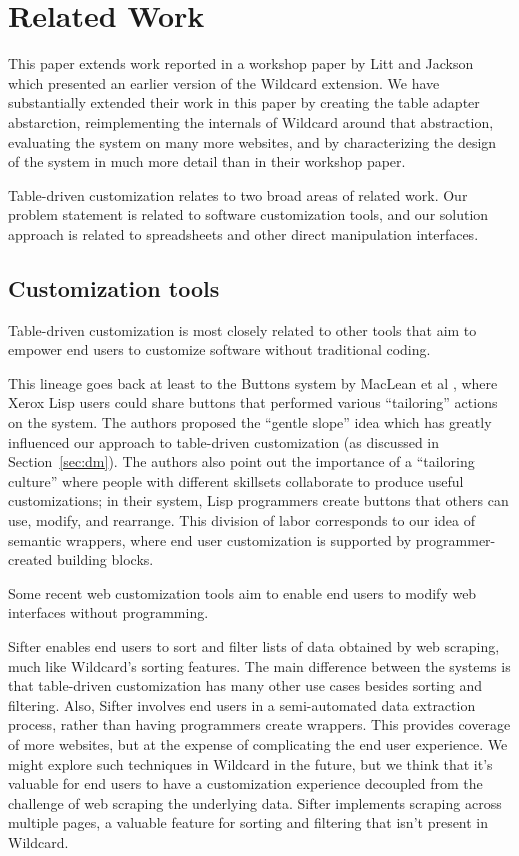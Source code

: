 \documentclass[sigplan,screen,10pt,anonymous,review]{acmart}
\begin{document}
\hypertarget{sec:related-work}{%
\section{Related Work}\label{sec:related-work}}

This paper extends work reported in a workshop paper by Litt and Jackson
\citep{litt2020} which presented an earlier version of the Wildcard
extension. We have substantially extended their work in this paper by
creating the table adapter abstarction, reimplementing the internals of
Wildcard around that abstraction, evaluating the system on many more
websites, and by characterizing the design of the system in much more
detail than in their workshop paper.

Table-driven customization relates to two broad areas of related work.
Our problem statement is related to software customization tools, and
our solution approach is related to spreadsheets and other direct
manipulation interfaces.

\hypertarget{customization-tools}{%
\subsection{Customization tools}\label{customization-tools}}

Table-driven customization is most closely related to other tools that
aim to empower end users to customize software without traditional
coding.

This lineage goes back at least to the Buttons system by MacLean et al
\citep{maclean1990}, where Xerox Lisp users could share buttons that
performed various ``tailoring'' actions on the system. The authors
proposed the ``gentle slope'' idea which has greatly influenced our
approach to table-driven customization (as discussed in
Section~\ref{sec:dm}). The authors also point out the importance of a
``tailoring culture'' where people with different skillsets collaborate
to produce useful customizations; in their system, Lisp programmers
create buttons that others can use, modify, and rearrange. This division
of labor corresponds to our idea of semantic wrappers, where end user
customization is supported by programmer-created building blocks.

Some recent web customization tools aim to enable end users to modify
web interfaces without programming.

Sifter \citep{huynh2006} enables end users to sort and filter lists of
data obtained by web scraping, much like Wildcard's sorting features.
The main difference between the systems is that table-driven
customization has many other use cases besides sorting and filtering.
Also, Sifter involves end users in a semi-automated data extraction
process, rather than having programmers create wrappers. This provides
coverage of more websites, but at the expense of complicating the end
user experience. We might explore such techniques in Wildcard in the
future, but we think that it's valuable for end users to have a
customization experience decoupled from the challenge of web scraping
the underlying data. Sifter implements scraping across multiple pages, a
valuable feature for sorting and filtering that isn't present in
Wildcard.
\end{document}
